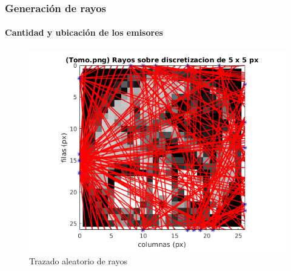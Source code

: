 \documentclass[11pt]{beamer}
\begin{document}
\begin{frame}
\frametitle{Generación de rayos}
\framesubtitle{Cantidad y ubicación de los emisores}
\begin{figure}[H] 
\centering
\includegraphics[scale=0.5]{img/rayos_tomo25x25px.png}
\caption{Trazado aleatorio de rayos}
\label{fig:rayos aleatorios}
\end{figure}
\end{frame}
\end{document}
